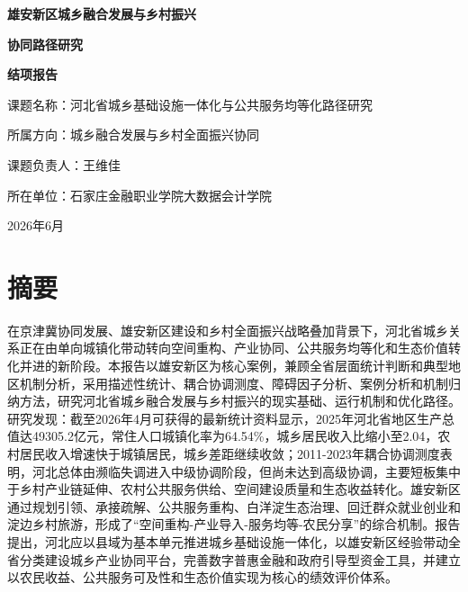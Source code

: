 \documentclass[UTF8,zihao=-4]{ctexart}
\begin{document}
\begin{titlepage}
    \centering
    \vspace*{2.2cm}
    {\bfseries 雄安新区城乡融合发展与乡村振兴\par}
    \vspace{0.25cm}
    {\bfseries 协同路径研究\par}
    \vspace{0.8cm}
    {\bfseries 结项报告\par}
    \vspace{1.5cm}
    { 课题名称：河北省城乡基础设施一体化与公共服务均等化路径研究\par}
    \vspace{0.4cm}
    { 所属方向：城乡融合发展与乡村全面振兴协同\par}
    \vspace{0.4cm}
    { 课题负责人：王维佳\par}
    \vspace{0.4cm}
    { 所在单位：石家庄金融职业学院大数据会计学院\par}
    \vfill
    { 2026年6月\par}
\end{titlepage}

\tableofcontents
\newpage

\section*{摘\quad 要}

在京津冀协同发展、雄安新区建设和乡村全面振兴战略叠加背景下，河北省城乡关系正在由单向城镇化带动转向空间重构、产业协同、公共服务均等化和生态价值转化并进的新阶段。本报告以雄安新区为核心案例，兼顾全省层面统计判断和典型地区机制分析，采用描述性统计、耦合协调测度、障碍因子分析、案例分析和机制归纳方法，研究河北省城乡融合发展与乡村振兴的现实基础、运行机制和优化路径。研究发现：截至2026年4月可获得的最新统计资料显示，2025年河北省地区生产总值达49305.2亿元，常住人口城镇化率为64.54\%，城乡居民收入比缩小至2.04，农村居民收入增速快于城镇居民，城乡差距继续收敛；2011-2023年耦合协调测度表明，河北总体由濒临失调进入中级协调阶段，但尚未达到高级协调，主要短板集中于乡村产业链延伸、农村公共服务供给、空间建设质量和生态收益转化。雄安新区通过规划引领、承接疏解、公共服务重构、白洋淀生态治理、回迁群众就业创业和淀边乡村旅游，形成了“空间重构-产业导入-服务均等-农民分享”的综合机制。报告提出，河北应以县域为基本单元推进城乡基础设施一体化，以雄安新区经验带动全省分类建设城乡产业协同平台，完善数字普惠金融和政府引导型资金工具，并建立以农民收益、公共服务可及性和生态价值实现为核心的绩效评价体系。
\end{document}
